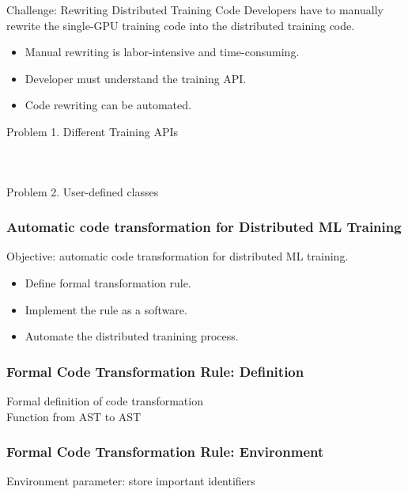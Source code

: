 \documentclass{beamer}
\begin{document}
\begin{frame}{Challenge: Rewriting Distributed Training Code}
  Developers have to manually rewrite the single-GPU training code
  into the distributed training code.
  \begin{itemize}
    \item Manual rewriting is labor-intensive and time-consuming.
    \item Developer must understand the training API.
    \item Code rewriting can be automated.
  \end{itemize}
\end{frame}


\begin{frame}{Problem 1. Different Training APIs}
  \begin{columns}[t]
    \begin{column}{.5\textwidth}
      {\tiny
        \inputminted{Python}{tensorflow_model_ex.py}
      }
    \end{column}
    \begin{column}{.5\textwidth}
      {\tiny
        \inputminted{Python}{horovod_model_ex.py}
      }
    \end{column}
  \end{columns}
\end{frame}


\begin{frame}{Problem 2. User-defined classes}
\end{frame}

\begin{frame}
  \frametitle{Automatic code transformation for Distributed ML Training}
  Objective: automatic code transformation for distributed ML training.
  \begin{itemize}
    \item Define formal transformation rule.
    \item Implement the rule as a software.
    \item Automate the distributed tranining process.
  \end{itemize}
\end{frame}


\begin{frame}
  \frametitle{Formal Code Transformation Rule: Definition}
  Formal definition of code transformation\\
  Function from AST to AST  
\end{frame}


\begin{frame}
  \frametitle{Formal Code Transformation Rule: Environment}
  Environment parameter: store important identifiers
\end{frame}
\end{document}
